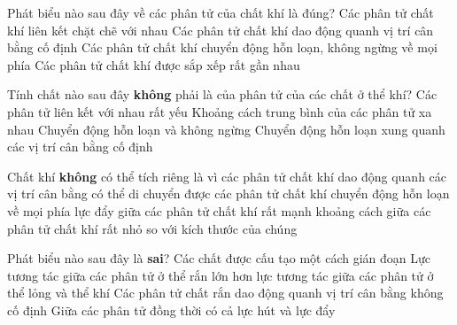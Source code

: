\begin{ex}%
Phát biểu nào sau đây về các phân tử của chất khí là đúng?
\choice
{Các phân tử chất khí liên kết chặt chẽ với nhau}
{Các phân tử chất khí dao động quanh vị trí cân bằng cố định}
{\True Các phân tử chất khí chuyển động hỗn loạn, không ngừng về mọi phía}
{Các phân tử chất khí được sắp xếp rất gần nhau}
\end{ex}

\begin{ex}%
Tính chất nào sau đây \textbf{không} phải là của phân tử của các chất ở thể khí?
\choice
{Các phân tử liên kết với nhau rất yếu}
{Khoảng cách trung bình của các phân tử xa nhau}
{Chuyển động hỗn loạn và không ngừng}
{\True Chuyển động hỗn loạn xung quanh các vị trí cân bằng cố định}
\end{ex}

\begin{ex}%
Chất khí \textbf{không} có thể tích riêng là vì
\choice
{các phân tử chất khí dao động quanh các vị trí cân bằng có thể di chuyển được}
{\True các phân tử chất khí chuyển động hỗn loạn về mọi phía}
{lực đẩy giữa các phân tử chất khí rất mạnh}
{khoảng cách giữa các phân tử chất khí rất nhỏ so với kích thước của chúng}
\end{ex}


\begin{ex}%
Phát biểu nào sau đây là \textbf{sai}?
\choice
{Các chất được cấu tạo một cách gián đoạn}
{Lực tương tác giữa các phân tử ở thể rắn lớn hơn lực tương tác giữa các phân tử ở thể lỏng và thể khí}
{\True Các phân tử chất rắn dao động quanh vị trí cân bằng không cố định}
{Giữa các phân tử đồng thời có cả lực hút và lực đẩy}
\end{ex}




